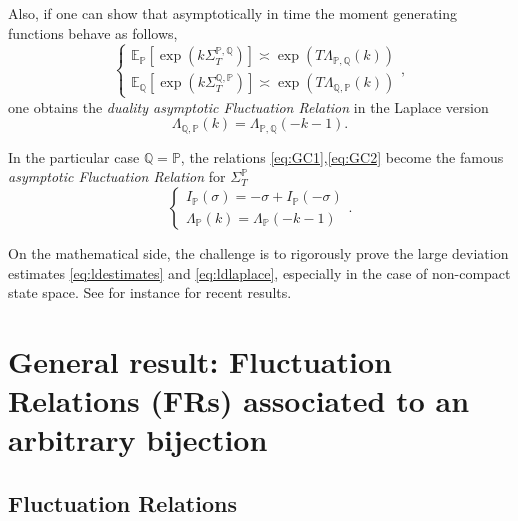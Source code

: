 \documentclass[a4paper,11pt]{article}
\numberwithin{equation}{section}
\begin{document}
Also, if one can show that asymptotically in time the moment generating functions behave as follows,
\begin{equation}\label{eq:ldlaplace}
 \begin{cases}
\mathbb{E}_{\mathbb{P}}\left[\exp\left(k\varSigma_{T}^{\mathbb{P},\mathbb{Q}}\right)\right]\asymp\exp\left(T\Lambda_{\mathbb{P},\mathbb{Q}}(k)\right)\\
\mathbb{E}_{\mathbb{Q}}\left[\exp\left(k\varSigma_{T}^{\mathbb{Q},\mathbb{P}}\right)\right]\asymp\exp\left(T\Lambda_{\mathbb{Q},\mathbb{P}}(k)\right)
\end{cases},  
\end{equation}
one obtains the \emph{duality asymptotic Fluctuation
Relation} in the Laplace version 
\begin{equation}
\Lambda_{\mathbb{Q},\mathbb{P}}(k)=\Lambda_{\mathbb{P},\mathbb{Q}}(-k-1).\label{eq:GC2}
\end{equation}


In the particular case $\mathbb{Q}=\mathbb{P}$, the relations \eqref{eq:GC1},\eqref{eq:GC2}
become the famous \emph{asymptotic Fluctuation
Relation} for $\varSigma_{T}^{\mathbb{P}}$ \cite{GC95a,Kur98,Gal99,LS99,Mae99,CG08,Sei12,Rol+24} 
\begin{equation}
\begin{cases}
I_{\mathbb{P}}\left(\sigma\right)=-\sigma+I_{\mathbb{P}}\left(-\sigma\right)\\
\Lambda_{\mathbb{P}}(k)=\Lambda_{\mathbb{P}}(-k-1)
\end{cases}.\label{eq:GC3}
\end{equation}

On the mathematical side, the challenge is to rigorously prove the large deviation estimates \eqref{eq:ldestimates} and \eqref{eq:ldlaplace}, especially in the case of non-compact state space. See for instance \cite{BdG15,BGL23,Raq24} for recent results.






\section{General result: Fluctuation Relations (FRs) associated to an arbitrary bijection}
\label{sec:General--transformation}

\subsection{Fluctuation Relations}
\end{document}
